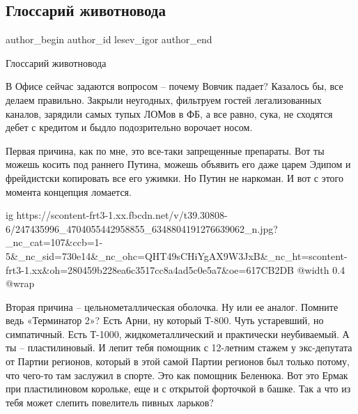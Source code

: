  
 
 
 
 
 
\subsection{Глоссарий животновода}
\label{sec:21_10_2021.fb.lesev_igor.1.glossarij_zhivotnovoda}
 
\ifcmt
 author_begin
   author_id lesev_igor
 author_end
\fi

Глоссарий животновода

В Офисе сейчас задаются вопросом – почему Вовчик падает? Казалось бы, все
делаем правильно. Закрыли неугодных, фильтруем гостей легализованных каналов,
зарядили самых тупых ЛОМов в ФБ, а все равно, сука, не сходятся дебет с
кредитом и быдло подозрительно ворочает носом.

Первая причина, как по мне, это все-таки запрещенные препараты. Вот ты можешь
косить под раннего Путина, можешь объявить его даже царем Эдипом и фрейдистски
копировать все его ужимки. Но Путин не наркоман. И вот с этого момента
концепция ломается.

\ifcmt
  ig https://scontent-frt3-1.xx.fbcdn.net/v/t39.30808-6/247435996_4704055442958855_6348804191276639062_n.jpg?_nc_cat=107&ccb=1-5&_nc_sid=730e14&_nc_ohc=QHT49sCHiYgAX9W3JxB&_nc_ht=scontent-frt3-1.xx&oh=280459b228ea6c3517cc8a4ad5c0e5a7&oe=617CB2DB
  @width 0.4
  @wrap 
\fi

Вторая причина – цельнометаллическая оболочка. Ну или ее аналог. Помните ведь
«Терминатор 2»? Есть Арни, ну который Т-800. Чуть устаревший, но симпатичный.
Есть Т-1000, жидкометаллический и практически неубиваемый. А ты –
пластилиновый. И лепит тебя помощник с 12-летним стажем у экс-депутата от
Партии регионов, который в этой самой Партии регионов был только потому, что
чего-то там заслужил в спорте. Это как помощник Беленюка. Вот это Ермак при
пластилиновом корольке, еще и с открытой форточкой в башке. Так а что из тебя
может слепить повелитель пивных ларьков?

